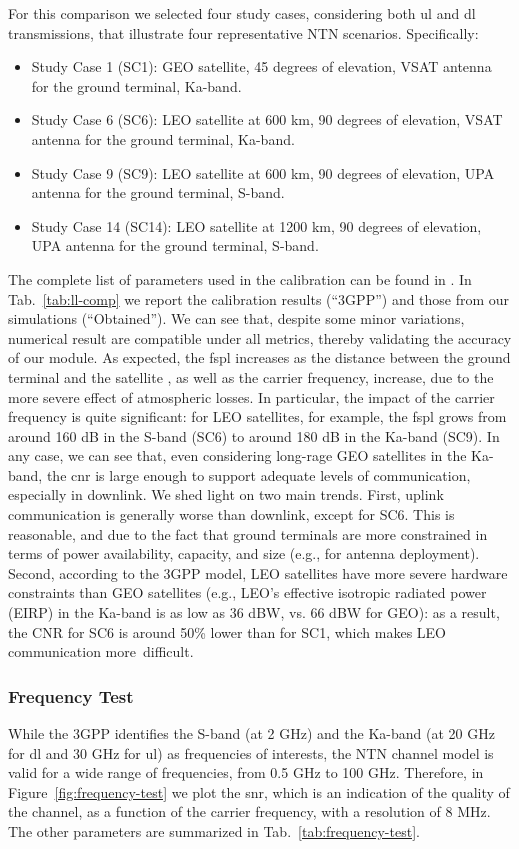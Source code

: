 For this comparison we selected four study cases, considering both \gls{ul} and \gls{dl} transmissions, that illustrate four  representative NTN scenarios. Specifically: 
\begin{itemize}
    \item Study Case 1 (SC1): GEO satellite, 45 degrees of elevation, VSAT antenna for the ground terminal,	Ka-band.
    \item Study Case 6 (SC6): LEO satellite at 600 km, 90 degrees of elevation, VSAT antenna for the ground terminal,	Ka-band.
    \item Study Case 9 (SC9): LEO satellite at 600 km, 90 degrees of elevation, UPA antenna for the ground terminal,	S-band.
    \item Study Case 14 (SC14): LEO satellite at 1200 km, 90 degrees of elevation, UPA antenna for the ground terminal,	S-band.
\end{itemize}
The complete list of parameters used in the calibration can be found in \cite[Section 6.1]{38821}. 
In Tab.~\ref{tab:ll-comp} we report the calibration results (``3GPP'') and those from our simulations (``Obtained''). We can see that, despite some minor variations, numerical result are compatible under all metrics, thereby validating the accuracy of our module. 
As expected, the \gls{fspl} increases as the distance between the ground terminal and the satellite , as well as the carrier frequency, increase, due to the more severe effect of atmospheric losses. In particular, the impact of the carrier frequency is quite significant: for LEO satellites, for example, the \gls{fspl} grows from around 160 dB in the S-band (SC6) to around 180 dB in the Ka-band (SC9). In any case, we can see that,  even considering long-rage GEO satellites in the Ka-band, the \gls{cnr} is large enough to support adequate levels of communication, especially in downlink. 
We shed light on two main trends. First, uplink communication is generally worse than downlink, except for SC6. This is reasonable, and due to the fact that ground terminals are more constrained in terms of power availability, capacity, and size (e.g., for antenna deployment).
Second, according to the 3GPP model, LEO satellites have more severe hardware constraints than GEO satellites (e.g., LEO's effective isotropic radiated power (EIRP) in the Ka-band is as low as 36 dBW, vs. 66 dBW for GEO): as a result, the CNR for SC6 is around 50\% lower than for SC1, which makes LEO communication more~difficult.


\subsubsection{Frequency Test}
While the 3GPP identifies the S-band (at 2 GHz) and the Ka-band (at 20 GHz for \gls{dl} and 30 GHz for \gls{ul}) as frequencies of interests, the NTN channel model is valid for a wide range of frequencies, from 0.5 GHz to 100 GHz. 
Therefore, in Figure~\ref{fig:frequency-test} we plot the \gls{snr}, which is an indication of the quality of the channel, as a function of the carrier frequency, with a resolution of 8 MHz. The other parameters are summarized in Tab.~\ref{tab:frequency-test}.

